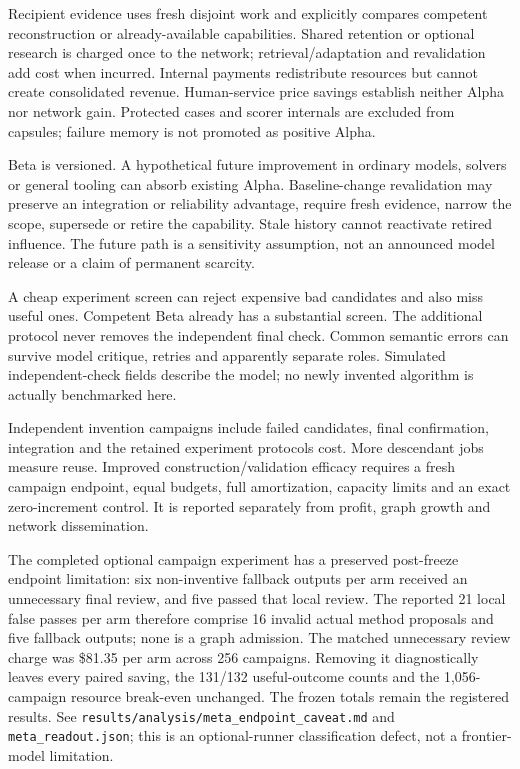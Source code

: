 \documentclass[
  10pt,
]{article}
\begin{document}
Recipient evidence uses fresh disjoint work and explicitly compares
competent reconstruction or already-available capabilities. Shared
retention or optional research is charged once to the network;
retrieval/adaptation and revalidation add cost when incurred. Internal
payments redistribute resources but cannot create consolidated revenue.
Human-service price savings establish neither Alpha nor network gain.
Protected cases and scorer internals are excluded from capsules; failure
memory is not promoted as positive Alpha.

Beta is versioned. A hypothetical future improvement in ordinary models,
solvers or general tooling can absorb existing Alpha. Baseline-change
revalidation may preserve an integration or reliability advantage,
require fresh evidence, narrow the scope, supersede or retire the
capability. Stale history cannot reactivate retired influence. The
future path is a sensitivity assumption, not an announced model release
or a claim of permanent scarcity.

A cheap experiment screen can reject expensive bad candidates and also
miss useful ones. Competent Beta already has a substantial screen. The
additional protocol never removes the independent final check. Common
semantic errors can survive model critique, retries and apparently
separate roles. Simulated independent-check fields describe the model;
no newly invented algorithm is actually benchmarked here.

Independent invention campaigns include failed candidates, final
confirmation, integration and the retained experiment
protocol\textquotesingle s cost. More descendant jobs measure reuse.
Improved construction/validation efficacy requires a fresh campaign
endpoint, equal budgets, full amortization, capacity limits and an exact
zero-increment control. It is reported separately from profit, graph
growth and network dissemination.

The completed optional campaign experiment has a preserved post-freeze
endpoint limitation: six non-inventive fallback outputs per arm received
an unnecessary final review, and five passed that local review. The
reported 21 local false passes per arm therefore comprise 16 invalid
actual method proposals and five fallback outputs; none is a graph
admission. The matched unnecessary review charge was \$81.35 per arm
across 256 campaigns. Removing it diagnostically leaves every paired
saving, the 131/132 useful-outcome counts and the 1,056-campaign
resource break-even unchanged. The frozen totals remain the registered
results. See \nolinkurl{results/analysis/meta_endpoint_caveat.md} and
\texttt{meta\_readout.json}; this is an optional-runner classification
defect, not a frontier-model limitation.
\end{document}

